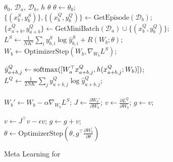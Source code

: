 \begin{wrapfigure}{R}{0.55\textwidth}
\vspace{-0.25in}
\begin{minipage}[t]{0.55\textwidth}
\begin{algorithm}[H]
\begin{small}
\caption{Meta Learning for {\ourproblem}}
\label{alg:energy}
\begin{algorithmic}[1]
\REQUIRE $\theta_0$, $\mathcal{D}_a$, $\mathcal{D}_b$, $h$
\ENSURE $\theta$
\STATE $\theta \gets \theta_0$;
\STATE $\{(x_b^S, y_b^S)\}, \{(x_b^Q,y_b^Q)\} \gets \text{GetEpisode}(\mathcal{D}_b)$;
\STATE $\{x_{a+b}^Q, y_{a+b}^Q\} \gets \text{GetMiniBatch}(\mathcal{D}_a) \cup \{(x_b^Q, y_b^Q)\}$;
\STATE $ $
\REPEAT
    \STATE $L^S \gets \frac{1}{NK'} \sum_i y_{b,i}^S \log \hat{y}_{b,i}^S + R(W_b; \theta)$;
    \STATE $W_b \gets \text{OptimizerStep}(W_b, \nabla_{W_b} L^S)$;

\STATE $\hat{y}_{a+b,j}^Q \gets \mathrm{softmax}([W_a^\top x_{a+b, j}^Q, h( x_{a+b, j}^Q;W_b) ])$;
\STATE $L^Q \gets \frac{1}{2NK'} \sum_j y_{a+b,j}^Q \log \hat{y}_{a+b,j}^Q$;
\STATE ~\\
\\
\STATE $W_b' \gets W_b - \alpha \nabla_{W_b} L^S$;%
\STATE $J \gets \frac{\partial W_b'}{\partial W_b}$; $v \gets \frac{\partial L^Q}{\partial W_b}$; $g \gets v$;

\REPEAT
\STATE $v \gets J^\top v - \epsilon v$; $g \gets g + v$;
\STATE ~\\
\STATE $\theta \gets \text{OptimizerStep}(\theta, g^\top \frac{\partial W_b^{\prime}}{\partial \theta})$
\ENDFOR
\end{algorithmic}
\end{small}
\end{algorithm}
\end{minipage}
\vspace{-0.1in}
\end{wrapfigure}
\fi